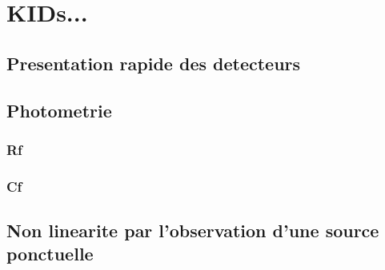 
\section{KIDs...}

\subsection{Presentation rapide des detecteurs}
\subsection{Photometrie}
\subsubsection{Rf}
\subsubsection{Cf}

\subsection{Non linearite par l'observation d'une source ponctuelle}
